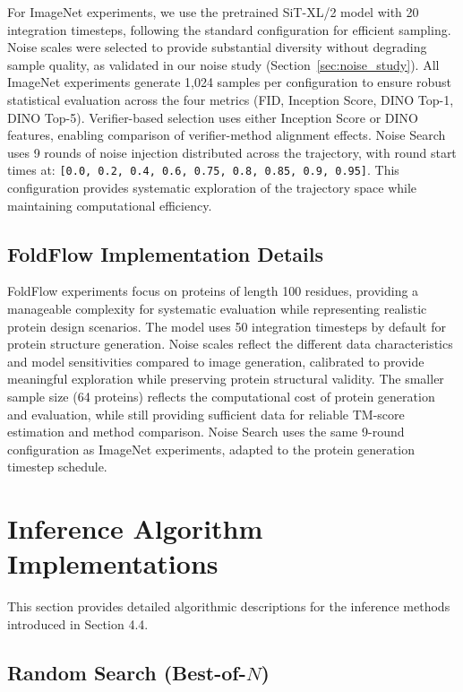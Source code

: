 \documentclass{article} %
\newcommand{\rev}[1]{{\color{blue}#1}}
\begin{document}
For ImageNet experiments, we use the pretrained SiT-XL/2 model with 20 integration timesteps, following the standard configuration for efficient sampling. Noise scales were selected to provide substantial diversity without degrading sample quality, as validated in our noise study (Section~\ref{sec:noise_study}). All ImageNet experiments generate 1,024 samples per configuration to ensure robust statistical evaluation across the four metrics (FID, Inception Score, DINO Top-1, DINO Top-5). Verifier-based selection uses either Inception Score or DINO features, enabling comparison of verifier-method alignment effects. Noise Search uses 9 rounds of noise injection distributed across the trajectory, with round start times at: \texttt{[0.0, 0.2, 0.4, 0.6, 0.75, 0.8, 0.85, 0.9, 0.95]}. This configuration provides systematic exploration of the trajectory space while maintaining computational efficiency.

\subsection{FoldFlow Implementation Details}
\label{app:foldflow-details}

FoldFlow experiments focus on proteins of length 100 residues, providing a manageable complexity for systematic evaluation while representing realistic protein design scenarios. The model uses 50 integration timesteps by default for protein structure generation. Noise scales reflect the different data characteristics and model sensitivities compared to image generation, calibrated to provide meaningful exploration while preserving protein structural validity. The smaller sample size (64 proteins) reflects the computational cost of protein generation and evaluation, while still providing sufficient data for reliable TM-score estimation and method comparison. Noise Search uses the same 9-round configuration as ImageNet experiments, adapted to the protein generation timestep schedule.

\section{Inference Algorithm Implementations}
\label{sec:algorithms}

This section provides detailed algorithmic descriptions for the inference methods introduced in Section \rev{4.4}.

\subsection{Random Search (Best-of-$N$)}
\label{app:random-search}
\end{document}
